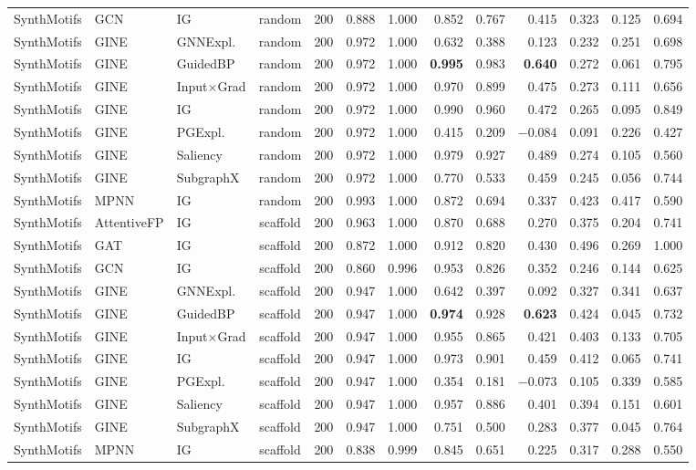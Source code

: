 \begin{table}[t]
{\begin{tabular}{lllcrrrrrrrrr}
SynthMotifs & GCN & IG & random & 200 & 0.888 & 1.000 & 0.852 & 0.767 & 0.415 & 0.323 & 0.125 & 0.694 \\
SynthMotifs & GINE & GNNExpl. & random & 200 & 0.972 & 1.000 & 0.632 & 0.388 & 0.123 & 0.232 & 0.251 & 0.698 \\
SynthMotifs & GINE & GuidedBP & random & 200 & 0.972 & 1.000 & \textbf{0.995} & 0.983 & \textbf{0.640} & 0.272 & 0.061 & 0.795 \\
SynthMotifs & GINE & Input$\times$Grad & random & 200 & 0.972 & 1.000 & 0.970 & 0.899 & 0.475 & 0.273 & 0.111 & 0.656 \\
SynthMotifs & GINE & IG & random & 200 & 0.972 & 1.000 & 0.990 & 0.960 & 0.472 & 0.265 & 0.095 & 0.849 \\
SynthMotifs & GINE & PGExpl. & random & 200 & 0.972 & 1.000 & 0.415 & 0.209 & $-$0.084 & 0.091 & 0.226 & 0.427 \\
SynthMotifs & GINE & Saliency & random & 200 & 0.972 & 1.000 & 0.979 & 0.927 & 0.489 & 0.274 & 0.105 & 0.560 \\
SynthMotifs & GINE & SubgraphX & random & 200 & 0.972 & 1.000 & 0.770 & 0.533 & 0.459 & 0.245 & 0.056 & 0.744 \\
SynthMotifs & MPNN & IG & random & 200 & 0.993 & 1.000 & 0.872 & 0.694 & 0.337 & 0.423 & 0.417 & 0.590 \\
\addlinespace[2pt]
SynthMotifs & AttentiveFP & IG & scaffold & 200 & 0.963 & 1.000 & 0.870 & 0.688 & 0.270 & 0.375 & 0.204 & 0.741 \\
SynthMotifs & GAT & IG & scaffold & 200 & 0.872 & 1.000 & 0.912 & 0.820 & 0.430 & 0.496 & 0.269 & 1.000 \\
SynthMotifs & GCN & IG & scaffold & 200 & 0.860 & 0.996 & 0.953 & 0.826 & 0.352 & 0.246 & 0.144 & 0.625 \\
SynthMotifs & GINE & GNNExpl. & scaffold & 200 & 0.947 & 1.000 & 0.642 & 0.397 & 0.092 & 0.327 & 0.341 & 0.637 \\
SynthMotifs & GINE & GuidedBP & scaffold & 200 & 0.947 & 1.000 & \textbf{0.974} & 0.928 & \textbf{0.623} & 0.424 & 0.045 & 0.732 \\
SynthMotifs & GINE & Input$\times$Grad & scaffold & 200 & 0.947 & 1.000 & 0.955 & 0.865 & 0.421 & 0.403 & 0.133 & 0.705 \\
SynthMotifs & GINE & IG & scaffold & 200 & 0.947 & 1.000 & 0.973 & 0.901 & 0.459 & 0.412 & 0.065 & 0.741 \\
SynthMotifs & GINE & PGExpl. & scaffold & 200 & 0.947 & 1.000 & 0.354 & 0.181 & $-$0.073 & 0.105 & 0.339 & 0.585 \\
SynthMotifs & GINE & Saliency & scaffold & 200 & 0.947 & 1.000 & 0.957 & 0.886 & 0.401 & 0.394 & 0.151 & 0.601 \\
SynthMotifs & GINE & SubgraphX & scaffold & 200 & 0.947 & 1.000 & 0.751 & 0.500 & 0.283 & 0.377 & 0.045 & 0.764 \\
SynthMotifs & MPNN & IG & scaffold & 200 & 0.838 & 0.999 & 0.845 & 0.651 & 0.225 & 0.317 & 0.288 & 0.550 \\
\bottomrule
\end{tabular}}
\end{table}
